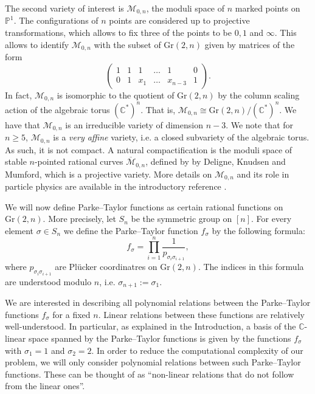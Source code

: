 \documentclass[12pt, reqno]{amsart}
\numberwithin{equation}{section}
\theoremstyle{plain}
\theoremstyle{definition}
\newcommand{\monbar}{\overline{\mathcal{M}}_{0, n}}
\begin{document}
The second variety of interest is $\mathcal{M}_{0,n}$, the moduli space of $n$ marked points on $\mathbb{P}^1$. The configurations of $n$ points are considered up to projective transformations, which allows to fix three of the points to be $0,1$ and $\infty$. This allows to identify $\mathcal{M}_{0,n}$ with the subset of $\mathrm{Gr}(2,n)$ given by matrices of the form 
$$
\begin{pmatrix}
    1 & 1 & 1 & \ldots & 1 & 0\\
    0 & 1 & x_1 & \ldots & x_{n-3} & 1
\end{pmatrix}.
$$
In fact, $\mathcal{M}_{0,n}$ is isomorphic to the quotient of $\mathrm{Gr}(2,n)$ by the column scaling action of the algebraic torus $(\mathbb{C}^*)^n$. That is, $\mathcal{M}_{0,n}\cong \mathrm{Gr}(2,n)/(\mathbb{C}^*)^n$. We have that $\mathcal{M}_{0,n}$ is an irreducible variety of dimension $n-3$. We note that for $n\geq 5$, $\mathcal{M}_{0,n}$ is a \emph{very affine} variety, i.e. a closed subvariety of the algebraic torus. As such, it is not compact. A natural compactification is the moduli space of stable $n$-pointed rational curves $\monbar$, defined by by Deligne, Knudsen and Mumford, which is a projective variety. More details on $\mathcal{M}_{0,n}$ and its role in particle physics are available in the introductory reference \cite{lam2024moduli}. 

We will now define Parke--Taylor functions as certain rational functions on $\mathrm{Gr}(2,n)$. More precisely, let $S_n$  be the symmetric group on $[n]$. For every element $\sigma \in S_n$ we define the Parke--Taylor function $f_\sigma$ by the following formula:
$$f_\sigma = \prod_{i=1}^n \dfrac{1}{p_{\sigma_i\sigma_{i+1}}},$$
where $p_{\sigma_i\sigma_{i+1}}$ are Pl\"ucker coordinatres on $\mathrm{Gr}(2,n)$. The indices in this formula are understood modulo $n$, i.e. $\sigma_{n+1}:=\sigma_1$. 

We are interested in describing all polynomial relations between the Parke--Taylor functions $f_\sigma$ for a fixed $n$. Linear relations between these functions are relatively well-understood. In particular, as explained in the Introduction, a basis of the $\mathbb{C}$-linear space spanned by the Parke--Taylor functions is given by the functions $f_{\sigma}$ with $\sigma_1=1$ and $\sigma_2=2$. In order to reduce the computational complexity of our problem, we will only consider polynomial relations between such Parke--Taylor functions. These can be thought of as ``non-linear relations that do not follow from the linear ones''. 
\end{document}
